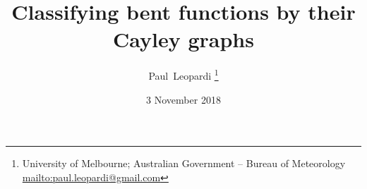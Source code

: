 \documentclass[12pt,a4paper]{article}
\title{Classifying bent functions by their Cayley graphs}
\author{
Paul~Leopardi
\thanks{University of Melbourne; Australian Government -- Bureau of Meteorology
\protect\url{mailto:paul.leopardi@gmail.com}}
}
\date{3 November 2018}
\begin{document}
\maketitle

\begin{abstract}

\end{abstract}


\end{document}

